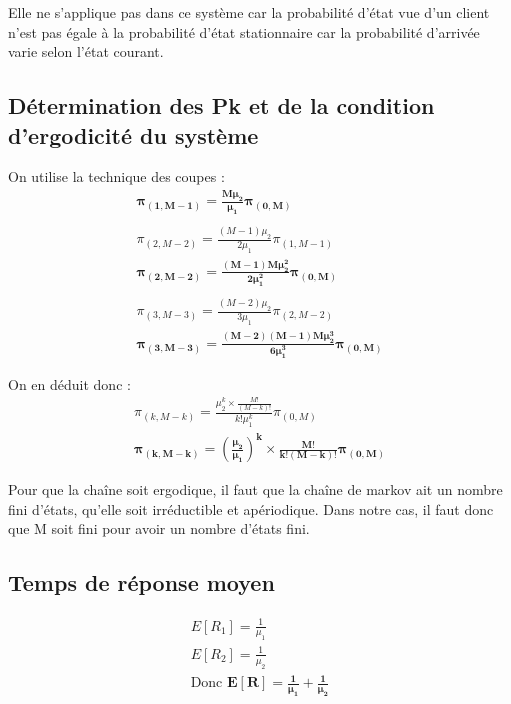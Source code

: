 \documentclass[12pt, a4paper]{article}
\begin{document}
\medskip
Elle ne s'applique pas dans ce syst\`eme car la probabilit\'e d'\'etat vue d'un client n'est pas \'egale \`a la probabilit\'e d'\'etat stationnaire car la probabilit\'e d'arriv\'ee varie selon l'\'etat courant.

\subsection{D\'etermination des Pk et de la condition d'ergodicit\'e du syst\`eme}
On utilise la technique des coupes :
\begin{gather*}
\bm{\pi_{(1,M-1)} = \frac{M\mu_{2}}{\mu_{1}}\pi_{(0,M)}} \\\\
\pi_{(2,M-2)} = \frac{(M-1)\mu_{2}}{2\mu_{1}}\pi_{(1,M-1)} \\
\bm{\pi_{(2,M-2)} = \frac{(M-1)M\mu_{2}^{2}}{2\mu_{1}^{2}}\pi_{(0,M)}} \\\\
\pi_{(3,M-3)} = \frac{(M-2)\mu_{2}}{3\mu_{1}}\pi_{(2,M-2)} \\
\bm{\pi_{(3,M-3)} = \frac{(M-2)(M-1)M\mu_{2}^{3}}{6\mu_{1}^{3}}\pi_{(0,M)}}
\end{gather*}

On en déduit donc :
\begin{gather*}
\pi_{(k,M-k)} = \frac{\mu_{2}^{k}\times \frac{M!}{(M-k)!}}{k!\mu_{1}^{k}}\pi_{(0,M)} \\
\bm{\pi_{(k,M-k)} = \left(\frac{\mu_{2}}{\mu_{1}}\right)^{k}\times \frac{M!}{k!(M-k)!}\pi_{(0,M)}}
\end{gather*}

Pour que la cha\^ine soit ergodique, il faut que la cha\^ine de markov ait un nombre fini d'\'etats, qu'elle soit irr\'eductible et ap\'eriodique. Dans notre cas, il faut donc que M soit fini pour avoir un nombre d'\'etats fini.

\subsection{Temps de r\'eponse moyen}

\begin{gather*}
E[R_{1}]=\frac{1}{\mu_{1}} \\
E[R_{2}] = \frac{1}{\mu_{2}} \\
\text{Donc } \bm{E[R] = \frac{1}{\mu_{1}} + \frac{1}{\mu_{2}}}
\end{gather*}
\end{document}
